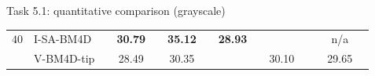 \documentclass[mathserif, 8pt]{beamer}
\newcommand{\bsic}[1]{\textcolor{gray}{#1}}
\newcommand{\Bsic}[1]{\textcolor{gray}{\textbf{#1}}}
\newcommand{\Best}[1]{\textbf{\textcolor{MyOrangeBrighter}{#1}}}
\begin{document}
\begin{frame}{Task 5.1: quantitative comparison (grayscale)}
\begin{center}
{\begin{tabular}{ c | l |c c | c c | c c | c c | c c | c c}
%                                                                                                                                                                                                                      
			\multirow{1}{*}{$40$}                                                                                                                                                                                         
			                      & I-SA-BM4D            & \bsic{     } & \Best{30.79} & \bsic{     } & \Best{35.12}  & \bsic{     } & \Best{28.93} &              &               &              &              &  n/a  \\
			                      & V-BM4D-tip           & \bsic{     } &       28.49  & \bsic{     } &       30.35   &              &              &              &       30.10   &              &              &  29.65  \\

\end{tabular}}
\end{center}
\end{frame}
\end{document}
